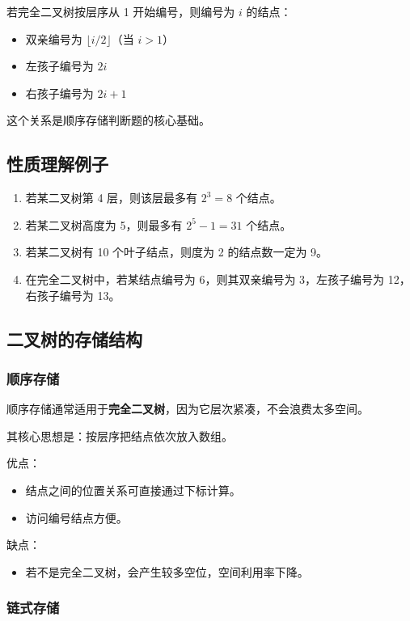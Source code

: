 \documentclass{../../note}
\begin{document}
若完全二叉树按层序从 1 开始编号，则编号为 $i$ 的结点：

\begin{itemize}
  \item 双亲编号为 $\lfloor i/2 \rfloor$（当 $i > 1$）
  \item 左孩子编号为 $2i$
  \item 右孩子编号为 $2i+1$
\end{itemize}

这个关系是顺序存储判断题的核心基础。

\subsection{性质理解例子}

\begin{enumerate}
  \item 若某二叉树第 4 层，则该层最多有 $2^3 = 8$ 个结点。
  \item 若某二叉树高度为 5，则最多有 $2^5 - 1 = 31$ 个结点。
  \item 若某二叉树有 10 个叶子结点，则度为 2 的结点数一定为 9。
  \item 在完全二叉树中，若某结点编号为 6，则其双亲编号为 3，左孩子编号为 12，右孩子编号为 13。
\end{enumerate}

\subsection{二叉树的存储结构}

\subsubsection{顺序存储}

顺序存储通常适用于\textbf{完全二叉树}，因为它层次紧凑，不会浪费太多空间。

其核心思想是：按层序把结点依次放入数组。

优点：
\begin{itemize}
  \item 结点之间的位置关系可直接通过下标计算。
  \item 访问编号结点方便。
\end{itemize}

缺点：
\begin{itemize}
  \item 若不是完全二叉树，会产生较多空位，空间利用率下降。
\end{itemize}

\subsubsection{链式存储}
\end{document}
